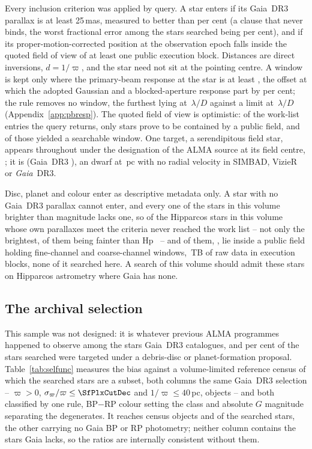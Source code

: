 Every inclusion criterion was applied by query. A star enters if its Gaia~DR3
parallax is at least 25\,mas, measured to better than \PlxAdqlPct{} per cent
(a clause that never binds, the worst fractional error among the stars
searched being \SfPlxWorstPct{} per cent), and if its proper-motion-corrected
position at the observation epoch falls inside the quoted field of view of at
least one public execution block. Distances are direct inversions,
$d=1/\varpi$, and the star need not sit at the pointing centre. A window is
kept only where the primary-beam response at the star is at least
\BmFloorResp, the offset at which the adopted Gaussian and a blocked-aperture
response part by \BmFloorTolPct{} per cent; the rule removes no window, the
furthest lying at \ExCWorstExt\,$\lambda/D$ against a limit at
\BmFloorC\,$\lambda/D$ (Appendix~\ref{app:pbresp}). The quoted field of view
is optimistic: of the \NCensus{} work-list entries the query returns, only
\NGenuinelyCovered{} stars prove to be contained by a public field, and
\NStars{} of those yielded a searchable window. One target, a serendipitous field star, appears throughout
under the designation of the ALMA source at its field centre, \BkAlmaName; it
is \BkAlmaTwoMass{} (Gaia~DR3 \BkAlmaGaia), an \BkAlmaSpType{} dwarf at
\BkAlmaDistPc\,pc with no radial velocity in SIMBAD, VizieR or \textit{Gaia}~DR3.

Disc, planet and colour enter as descriptive metadata only. A star with no
Gaia~DR3 parallax cannot enter, and every one of the \BsNBright{} stars in this
volume brighter than \BsBrightMag{} magnitude lacks one, so \BsNGap{} of the
\BsNVol{} Hipparcos stars
in this volume whose own parallaxes meet the criteria never reached the work
list -- not only the brightest, \BsGapNFaint{} of them being fainter than
Hp~\BsGapMagCut{} -- and \BsNAlmaWord{} of them, \BsStarList, lie inside a
public field holding \BsNWinA{} fine-channel and \BsNWinB{} coarse-channel
windows, \BsRawTB\,TB of raw data in \BsNEB{} execution blocks, none of it
searched here. A search of this volume should admit these stars on Hipparcos
astrometry where Gaia has none.


\subsection{The archival selection}
\label{sec:bias}

This sample was not designed: it is whatever previous ALMA programmes happened
to observe among the stars Gaia~DR3 catalogues, and \PctDiscProposal{} per cent
of the stars searched were targeted under a debris-disc or planet-formation
proposal. Table~\ref{tab:selfunc} measures the bias against a volume-limited
reference census of which the searched stars are a subset, both columns the
same Gaia~DR3 selection -- $\varpi>0$, $\sigma_\varpi/\varpi\le\SfPlxCutDec$
and $1/\varpi\le40$\,pc, \SfCensusN{} objects -- and both classified by one
rule, BP$-$RP colour setting the class and absolute $G$ magnitude separating
the degenerates. It reaches \SfCensusNCol{} census objects and
\SfNClassified{} of the \SfNStar{} searched stars, the other \SfNNoColour{}
carrying no Gaia BP or RP photometry; neither column contains the stars Gaia
lacks, so the ratios are internally consistent without them.

